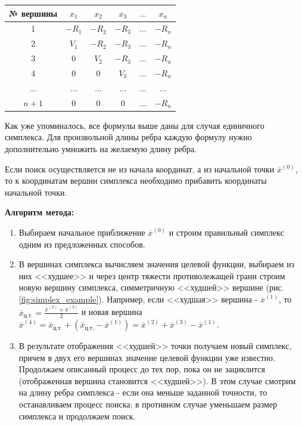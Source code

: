 \documentclass[a4paper,12pt]{report}
\begin{document}
\begin{enumerate}
\begin{table}[h]
\begin{center}
\captionsetup{justification=raggedleft}
\caption{\hspace{43mm}~}
\label{tab:simplex_2_n}
    \begin{tabular}{|c|c|c|c|c|c|}
      \hline
      № вершины & $x_{1}$ & $x_{2}$ & $x_{3}$ & $\ldots$ & $x_{n}$\\
      \hline
      1 & $-R_{1}$ & $-R_{2}$ & $-R_{3}$ & $\ldots$ & $-R_{n}$\\
      \hline
      2 & $V_{1}$ & $-R_{2}$ & $-R_{3}$ & $\ldots$ & $-R_{n}$\\
      \hline
      3 & 0 & $V_{2}$ & $-R_{3}$ & $\ldots$ & $-R_{n}$\\
      \hline
      4 & 0 & 0 & $V_{3}$ & $\ldots$ & $-R_{n}$\\
      \hline
      $\ldots$ & $\ldots$ & $\ldots$ & $\ldots$ & $\ldots$ & $\ldots$\\
      \hline
      $n+1$ & 0 & 0 & 0 & $\ldots$ & $-R_{n}$\\
      \hline
    \end{tabular}
\end{center}
\end{table}

\end{enumerate}

Как уже упоминалось, все формулы выше даны для случая единичного симплекса. Для произвольной длины ребра каждую формулу нужно дополнительно умножить на желаемую длину ребра.

Если поиск осуществляется не из начала координат, а из начальной точки $\overline{x}^{(0)}$, то к координатам вершин симплекса необходимо прибавить координаты начальной точки.

\textbf{Алгоритм метода:}
\begin{enumerate}
\item Выбираем начальное приближение $\overline{x}^{(0)}$ и строим правильный симплекс одним из предложенных способов.
\item В вершинах симплекса вычисляем значения целевой функции, выбираем из них <<худшее>> и через центр тяжести противолежащей грани строим новую вершину симплекса, симметричную <<худшей>> вершине (рис. \ref{fig:simplex_example}). Например, если <<худшая>> вершина - $\overline{x}^{(1)}$, то $\overline{x}_{\text{ц.т.}} = \frac{\overline{x}^{(2)} + \overline{x}^{(3)}}{2}$ и новая вершина $\overline{x}^{(4)} = \overline{x}_{\text{ц.т.}} + (\overline{x}_{\text{ц.т.}} - \overline{x}^{(1)}) = \overline{x}^{(2)} + \overline{x}^{(3)} - \overline{x}^{(1)}$.
\item В результате отображения <<худшей>> точки получаем новый симплекс, причем в двух его вершинах значение целевой функции уже известно. Продолжаем описанный процесс до тех пор, пока он не зациклится (отображенная вершина становится <<худшей>>). В этом случае смотрим на длину ребра симплекса - если она меньше заданной точности, то останавливаем процесс поиска; в противном случае уменьшаем размер симплекса и продолжаем поиск.
\end{enumerate}
\end{document}
